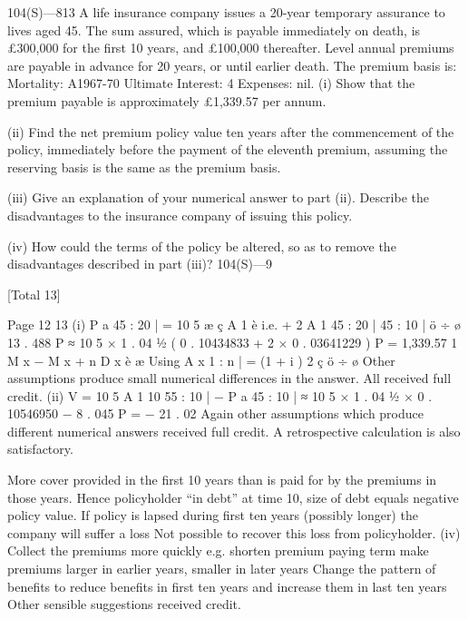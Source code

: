 104(S)—813
A life insurance company issues a 20-year temporary assurance to lives aged 45.
The sum assured, which is payable immediately on death, is £300,000 for the
first 10 years, and £100,000 thereafter. Level annual premiums are payable in
advance for 20 years, or until earlier death.
The premium basis is:
Mortality: A1967-70 Ultimate
Interest: 4%
Expenses: nil.
(i) Show that the premium payable is approximately £1,339.57 per annum.

(ii) Find the net premium policy value ten years after the commencement of
the policy, immediately before the payment of the eleventh premium,
assuming the reserving basis is the same as the premium basis.

(iii) Give an explanation of your numerical answer to part (ii). Describe the
disadvantages to the insurance company of issuing this policy.

(iv) How could the terms of the policy be altered, so as to remove the
disadvantages described in part (iii)?
104(S)—9

[Total 13]


Page 12%
13
(i)
P a   45 : 20 | = 10 5 æ ç A 1
è
i.e.
+ 2 A 1
45 : 20 |
45 : 10 |
ö
÷
ø
13 . 488 P ≈ 10 5 × 1 . 04 1⁄2 ( 0 . 10434833 + 2 × 0 . 03641229 )
P = 1,339.57
1
M x − M x + n
D x
è
æ
Using A x 1 : n | = (1 + i ) 2 ç
ö
÷
ø
Other assumptions produce small numerical differences in the answer. All
received full credit.
(ii)
V = 10 5 A 1
10
55 : 10 |
− P a   45 : 10 | ≈ 10 5 × 1 . 04 1⁄2 × 0 . 10546950 − 8 . 045 P = − 21 . 02
Again other assumptions which produce different numerical answers
received full credit.
A retrospective calculation is also satisfactory.

More cover provided in the first 10 years than is paid for by the premiums
in those years.
Hence policyholder “in debt” at time 10, size of debt equals negative policy
value.
If policy is lapsed during first ten years (possibly longer) the company will
suffer a loss
Not possible to recover this loss from policyholder.
(iv)
Collect the premiums more quickly
e.g. shorten premium paying term
make premiums larger in earlier years, smaller in later years
Change the pattern of benefits to reduce benefits in first ten years and
increase them in last ten years
Other sensible suggestions received credit.

